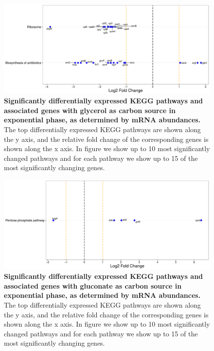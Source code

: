 \documentclass[a4paper]{article}
\begin{document}
\clearpage

\begin{figure}[!htb]
	\includegraphics[width=1.0\textwidth]{../../d_figures/kegg_01.pdf}
	\caption[Significantly altered KEGG pathways for mRNA samples in exponential phase tested for glycerol against glucose]
	{\textbf{Significantly differentially expressed KEGG pathways and associated genes with glycerol as carbon source in exponential phase, as determined by mRNA abundances.} The top differentially expressed KEGG pathways are shown along the y axis, and the relative fold change of the corresponding genes is shown along the x axis. In figure we show up to 10 most significantly changed pathways and for each pathway we show up to 15 of the most significantly changing genes.}
\end{figure}

\clearpage
\begin{figure}
	\includegraphics[width=1.0\textwidth]{../../d_figures/kegg_02.pdf}
	\caption[Significantly altered KEGG pathways for mRNA samples in exponential phase tested for  against glucose]
	{\textbf{Significantly differentially expressed KEGG pathways and associated genes with gluconate as carbon source in exponential phase, as determined by mRNA abundances.} The top differentially expressed KEGG pathways are shown along the y axis, and the relative fold change of the corresponding genes is shown along the x axis. In figure we show up to 10 most significantly changed pathways and for each pathway we show up to 15 of the most significantly changing genes.}
\end{figure}
\end{document}
